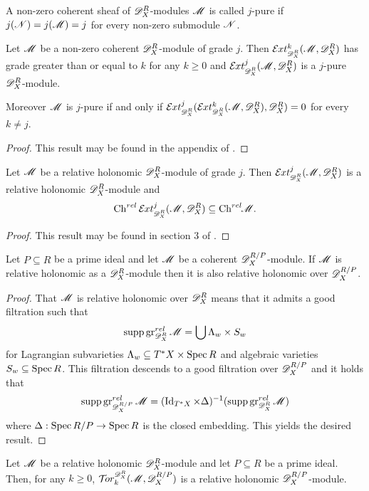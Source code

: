 \begin{definition}
  A non-zero coherent sheaf of $\mathscr{D}_X^R$-modules $\mathscr{M}$ is called $j$-pure if $j(\mathscr{N})=j(\mathscr{M})=j$ for every non-zero submodule $\mathscr{N}$.
\end{definition}
\begin{lemma}\label{lem: ExtGrade}
  Let $\mathscr{M}$ be a non-zero coherent $\mathscr{D}_X^R$-module of grade $j$. Then $\Ex{\D_X^R}{k}(\M,\D_X^R)$ has grade greater than or equal to $k$ for any $k\geq 0$ and $\Ex{\D_X^R}{j}(\M,\D_X^R)$ is a $j$-pure $\mathscr{D}_X^R$-module.

  Moreover $\mathscr{M}$ is $j$-pure if and only if $\Ex{\D_X^R}{j}(\Ex{\D_X^R}{k}(\M,\D_X^R),\D_X^R)=0$ for every $k\neq j$.
\end{lemma}
\begin{proof}
  This result may be found in the appendix of \cite{budur2019zero}.
\end{proof}
\begin{lemma}\label{lem: ExtRelHol}
  Let $\mathscr{M}$ be a relative holonomic $\mathscr{D}_X^R$-module of grade $j$. Then $\Ex{\D_X^R}{j}(\M,\D_X^R)$ is a relative holonomic $\mathscr{D}_X^R$-module and
  $$\Ch^{rel}\Ex{\D_X^R}{j}(\M,\D_X^R)\subseteq \Chrel \M. $$
\end{lemma}
\begin{proof}
  This result may be found in section 3 of \cite{budur2019zero}.
\end{proof}
\begin{lemma}
  Let $P \subseteq R$ be a prime ideal and let $\mathscr{M}$ be a coherent $\mathscr{D}_X^{R/P}$-module. If $\mathscr{M}$ is relative holonomic as a $\mathscr{D}_X^R$-module then it is also relative holonomic over $\mathscr{D}_X^{R/P}$.
\end{lemma}
\begin{proof}
  That $\mathscr{M}$ is relative holonomic over $\mathscr{D}_X^{R}$ means that it admits a good filtration such that
  $$\operatorname{supp} \operatorname{gr}_{\mathscr{D}_X^R}^{rel} \mathscr{M}  = \bigcup \Lambda_w \times S_w$$
  for Lagrangian subvarieties $\Lambda_w \subseteq T^* X \times \operatorname{Spec} R$ and algebraic varieties $S_w \subseteq \operatorname{Spec} R$.
  This filtration descends to a good filtration over $\mathscr{D}_{X}^{R/P}$ and it holds that
  $$\operatorname{supp} \operatorname{gr}_{\mathscr{D}_X^{R/P}}^{rel}\mathscr{M} = (\operatorname{Id}_{T^*X} \times \Delta)^{-1}(\operatorname{supp} \operatorname{gr}_{\mathscr{D}_X^R}^{rel}\mathscr{M})$$
  where $\Delta:\operatorname{Spec} R/P\to \operatorname{Spec} R$ is the closed embedding.
  This yields the desired result.
\end{proof}
\begin{lemma}\label{lem: TorRelHol}
  Let $\mathscr{M}$ be a relative holonomic $\mathscr{D}_X^R$-module and let $P\subseteq R$ be a prime ideal. Then, for any $k\geq 0$, $\Tr{\D_X^R}{k}(\M, \D_X^{R/P})$ is a relative holonomic $\mathscr{D}_X^{R/P}$-module.
 \end{lemma}
